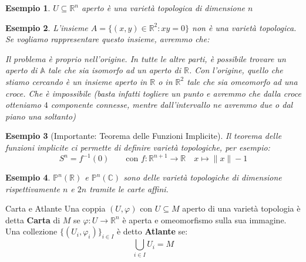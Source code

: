 \documentclass[11pt,a4paper,twoside]{article}
\newtheorem{es}{Esempio}
\theoremstyle{definition}
\begin{document}
\begin{es}
	$U\subseteq \mathbb R^n$ aperto è una varietà topologica di dimensione $n$
\end{es}

\begin{es}
	L'insieme $A=\{(x,y)\in \mathbb R^2:xy = 0\}$ non è una varietà topologica.\\
	Se vogliamo rappresentare questo insieme, avremmo che:
	\begin{center}
	\end{center}
	Il problema è proprio nell'origine. In tutte le altre parti, è possibile trovare un aperto di $\mathbb A$ tale che sia isomorfo ad un aperto di $\mathbb R$. Con l'origine, quello che stiamo cercando è un insieme aperto in $\mathbb R$ o in $\mathbb R^2$ tale che sia omeomorfo ad una croce. Che è impossibile (basta infatti togliere un punto e avremmo che dalla croce otteniamo $4$ componente connesse, mentre dall'intervallo ne avremmo due o dal piano una soltanto)
\end{es}

\begin{es}[Importante: Teorema delle Funzioni Implicite]
	Il teorema delle funzioni implicite ci permette di definire varietà topologiche, per esempio:
	\[ S^n = f^{-1}(0)\qquad \text{con }f:\mathbb R^{n+1}\to \mathbb R\quad x \mapsto \|x\|-1 \]
\end{es}

\begin{es}
	$\mathbb P^n(\mathbb R)$ e $\mathbb P^n(\mathbb C)$ sono delle varietà topologiche di dimensione rispettivamente $n$ e $2n$ tramite le carte affini.
\end{es}

\begin{defn}{Carta e Atlante}{}
	Una coppia $(U, \varphi)$ con $U\subseteq M$ aperto di una varietà topologia è detta \textbf{Carta} di $M$ se $\varphi:U \to \mathbb R^n$ è aperta e omeomorfismo sulla sua immagine. Una collezione $\{(U_i, \varphi_i)\}_{i \in I}$ è detto \textbf{Atlante} se:
	\[ \bigcup_{i \in I}U_i = M \]
\end{defn}
\end{document}
